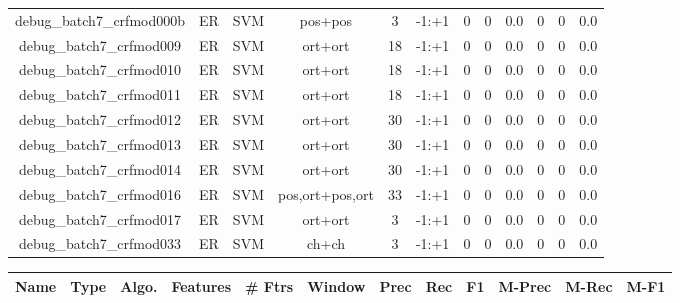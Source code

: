 \documentclass[a4paper]{article}
\begin{document}
\begin{landscape}
\begin{center}
\begin{tabular}{ |c|c|c|c|c|c|c|c|c|c|c|c|}
 
 	
 	\small{ debug\_batch7\_crfmod000b } & ER & SVM & pos+pos  &  3 &  -1:+1  &  0 & 0 & 0.0  &  0 & 0 & 0.0 \\
 	

 
 	
 	\small{ debug\_batch7\_crfmod009 } & ER & SVM & ort+ort  &  18 &  -1:+1  &  0 & 0 & 0.0  &  0 & 0 & 0.0 \\
 	

 
 	
 	\small{ debug\_batch7\_crfmod010 } & ER & SVM & ort+ort  &  18 &  -1:+1  &  0 & 0 & 0.0  &  0 & 0 & 0.0 \\
 	

 
 	
 	\small{ debug\_batch7\_crfmod011 } & ER & SVM & ort+ort  &  18 &  -1:+1  &  0 & 0 & 0.0  &  0 & 0 & 0.0 \\
 	

 
 	
 	\small{ debug\_batch7\_crfmod012 } & ER & SVM & ort+ort  &  30 &  -1:+1  &  0 & 0 & 0.0  &  0 & 0 & 0.0 \\
 	

 
 	
 	\small{ debug\_batch7\_crfmod013 } & ER & SVM & ort+ort  &  30 &  -1:+1  &  0 & 0 & 0.0  &  0 & 0 & 0.0 \\
 	

 
 	
 	\small{ debug\_batch7\_crfmod014 } & ER & SVM & ort+ort  &  30 &  -1:+1  &  0 & 0 & 0.0  &  0 & 0 & 0.0 \\
 	

 
 	
 	\small{ debug\_batch7\_crfmod016 } & ER & SVM & pos,ort+pos,ort  &  33 &  -1:+1  &  0 & 0 & 0.0  &  0 & 0 & 0.0 \\
 	

 
 	
 	\small{ debug\_batch7\_crfmod017 } & ER & SVM & ort+ort  &  3 &  -1:+1  &  0 & 0 & 0.0  &  0 & 0 & 0.0 \\
 	

 
 	
 	\small{ debug\_batch7\_crfmod033 } & ER & SVM & ch+ch  &  3 &  -1:+1  &  0 & 0 & 0.0  &  0 & 0 & 0.0 \\
 	
 \hline
\end{tabular}
\end{center}




\begin{center}
\begin{tabular}{ |c|c|c|c|c|c|c|c|c|c|c|c|} 
 \hline
 	Name & Type & Algo. & Features & \# Ftrs & Window & Prec & Rec & F1 & M-Prec & M-Rec & M-F1\\
 \hline


\end{tabular}
\end{center}
\end{landscape}
\end{document}
